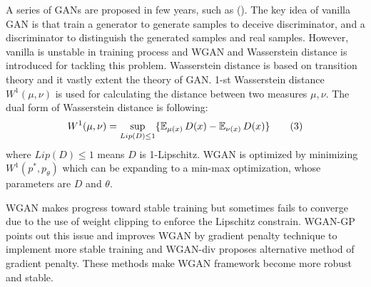 A series of GANs are proposed in few years, such as (). The key idea of vanilla GAN is that train a generator to generate samples to deceive discriminator, and a discriminator to distinguish the generated samples and real samples. However, vanilla is unstable in training process and WGAN and Wasserstein distance is introduced for tackling this problem. Wasserstein distance is based on transition theory and it vastly extent the theory of GAN. 1-st Wasserstein distance $W^1(\mu, \nu)$ is used for calculating the distance between two measures $\mu, \nu$. The dual form of Wasserstein distance is following:
\begin{align*} \label{eq:Wasserstein-distance}
W^1(\mu, \nu) = \sup_{Lip(D) \leq 1} \{\operatorname{\mathbb{E}}_{\mu(x)} D(x)  - \operatorname{\mathbb{E}}_{\nu(x)} D(x)\} \tag{3}
\end{align*}
where $Lip(D) \leq 1$ means $D$ is 1-Lipschitz. WGAN is optimized by minimizing $W^1(p^*, p_\theta)$ which can be expanding to a min-max optimization, whose parameters are $D$ and $\theta$. 

WGAN makes progress toward stable training but sometimes fails to converge due to the use of weight clipping to enforce the Lipschitz constrain. WGAN-GP points out this issue and improves WGAN by gradient penalty technique to implement more stable training and WGAN-div proposes alternative method of gradient penalty. These methods make WGAN framework become more robust and stable. 
